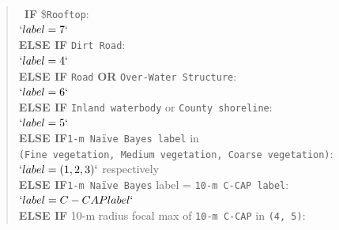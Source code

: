\documentclass[
]{report}
\begin{document}
\begin{quote}
~\textbf{IF} \$\texttt{Rooftop}:\\
\hspace*{0.333em}\hspace*{0.333em}\hspace*{0.333em}\hspace*{0.333em}\(`label = 7`\)\\
\hspace*{0.333em}\textbf{ELSE IF} \texttt{Dirt\ Road}:\\
\hspace*{0.333em}\hspace*{0.333em}\hspace*{0.333em}\hspace*{0.333em}\(`label = 4`\)\\
\hspace*{0.333em}\textbf{ELSE IF} \texttt{Road} \textbf{OR} \texttt{Over-Water\ Structure}:\\
\hspace*{0.333em}\hspace*{0.333em}\hspace*{0.333em}\(`label = 6`\)\\
\hspace*{0.333em}\textbf{ELSE IF} \texttt{Inland\ waterbody} or \texttt{County\ shoreline}:\\
\hspace*{0.333em}\hspace*{0.333em}\hspace*{0.333em}\(`label = 5`\)\\
\hspace*{0.333em}\textbf{ELSE IF}\texttt{1-m\ Naïve\ Bayes\ label} in \texttt{(Fine\ vegetation,\ Medium\ vegetation,\ Coarse\ vegetation)}:\\
\hspace*{0.333em}\(`label = (1, 2, 3)`\) respectively\\
\hspace*{0.333em}\textbf{ELSE IF}\texttt{1-m\ Naïve\ Bayes} label = \texttt{10-m\ C-CAP\ label}:\\
\hspace*{0.333em}\hspace*{0.333em}\hspace*{0.333em}\(`label = C-CAP label`\)\\
\hspace*{0.333em}\textbf{ELSE IF} 10-m radius focal max of \texttt{10-m\ C-CAP} in \texttt{(4,\ 5)}:\\

\end{quote}
\end{document}
